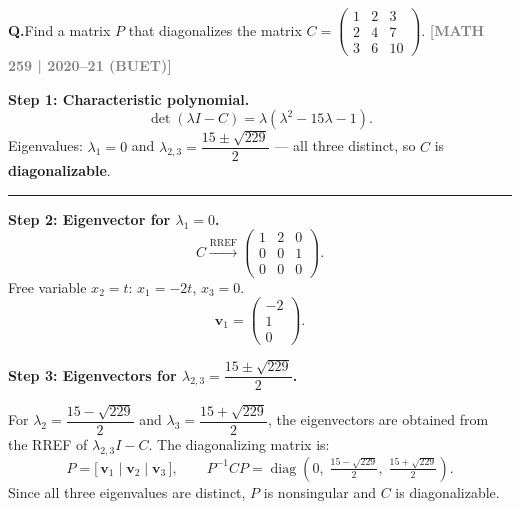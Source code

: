 \documentclass[12pt,a3paper]{article}
\newcommand{\yr}[1]{\hfill\textcolor{gray}{\small\textbf{[#1]}}}
\newcounter{qnum}
\newcommand{\Q}[1]{%
  \needspace{4\baselineskip}
  \refstepcounter{qnum}
  \vspace{6pt}
  \noindent\textbf{Q\theqnum.}\enspace #1\par
}
\begin{document}
\Q{Find a matrix $P$ that diagonalizes the matrix $C = \begin{pmatrix} 1 & 2 & 3 \\ 2 & 4 & 7 \\ 3 & 6 & 10 \end{pmatrix}$.
\yr{MATH 259 | 2020--21 (BUET)}}


\begin{tcolorbox}[enhanced,breakable,
  colback=cE!4,colframe=cE,boxrule=0.8pt,arc=5pt,
  title={\textbf{Answer --- Diagonalizing
    $C=\begin{pmatrix}1&2&3\\2&4&7\\3&6&10\end{pmatrix}$}},
  fonttitle=\bfseries\color{white},colbacktitle=cE]

\textbf{Step 1: Characteristic polynomial.}
\[
  \det(\lambda I-C) = \lambda(\lambda^2-15\lambda-1).
\]
Eigenvalues: $\lambda_1=0$ and $\lambda_{2,3}=\dfrac{15\pm\sqrt{229}}{2}$ — all three distinct,
so $C$ is \textbf{diagonalizable}.

\medskip\textcolor{cE}{\rule{\textwidth}{0.4pt}}

\textbf{Step 2: Eigenvector for $\lambda_1=0$.}
\[
  C\xrightarrow{\text{RREF}}
  \begin{pmatrix}1&2&0\\0&0&1\\0&0&0\end{pmatrix}.
\]
Free variable $x_2=t$: $x_1=-2t$, $x_3=0$.
\[
  \mathbf{v}_1=\begin{pmatrix}-2\\1\\0\end{pmatrix}.
\]

\textbf{Step 3: Eigenvectors for $\lambda_{2,3}=\dfrac{15\pm\sqrt{229}}{2}$.}

For $\lambda_2 = \dfrac{15-\sqrt{229}}{2}$ and $\lambda_3 = \dfrac{15+\sqrt{229}}{2}$,
the eigenvectors are obtained from the RREF of $\lambda_{2,3}I - C$.
The diagonalizing matrix is:
\[
  P = \bigl[\,\mathbf{v}_1\;\big|\;\mathbf{v}_2\;\big|\;\mathbf{v}_3\,\bigr], \qquad
  P^{-1}CP = \operatorname{diag}\!\left(0,\;\tfrac{15-\sqrt{229}}{2},\;\tfrac{15+\sqrt{229}}{2}\right).
\]
Since all three eigenvalues are distinct, $P$ is nonsingular and $C$ is
diagonalizable. \checkmark

\end{tcolorbox}
\end{document}
